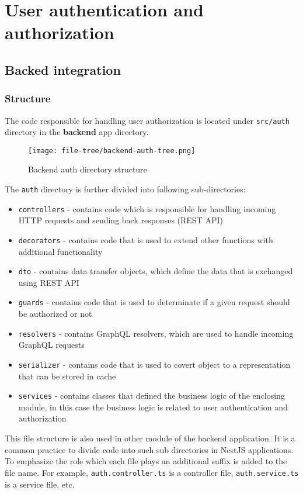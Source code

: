 \documentclass[../main.tex]{subfiles}
\begin{document}
\section{User authentication and authorization}

\subsection{Backed integration}

\subsubsection{Structure}

The code responsible for handling user authorization is located
under \texttt{src/auth} directory in the \textbf{backend} app directory.

\begin{figure}[H]
  \centering
  \texttt{[image: file-tree/backend-auth-tree.png]}
  \caption{Backend auth directory structure}
\end{figure}

The \texttt{auth} directory is further divided into following sub-directories:
\begin{itemize}
  \item \texttt{controllers} - contains code which is responsible for handling incoming HTTP requests and sending back responses (REST API)
  \item \texttt{decorators} - contains code that is used to extend other functions with additional functionality
  \item \texttt{dto} - contains data transfer objects, which define the data that is exchanged using REST API
  \item \texttt{guards} - contains code that is used to determinate if a given request should be authorized or not
  \item \texttt{resolvers} - contains GraphQL resolvers, which are used to handle incoming GraphQL requests
  \item \texttt{serializer} - contains code that is used to covert object to a representation that can be stored in cache
  \item \texttt{services} - contains classes that defined the business logic of the enclosing module, in this case the business logic is related to user authentication and authorization
\end{itemize}
This file structure is also used in other module of the backend application. It is a common practice to divide code into such sub directories in NestJS applications.
To emphasize the role which each file plays an additional suffix is added to the file name. For example, \texttt{auth.controller.ts} is a controller file, \texttt{auth.service.ts} is a service file, etc.
\end{document}
